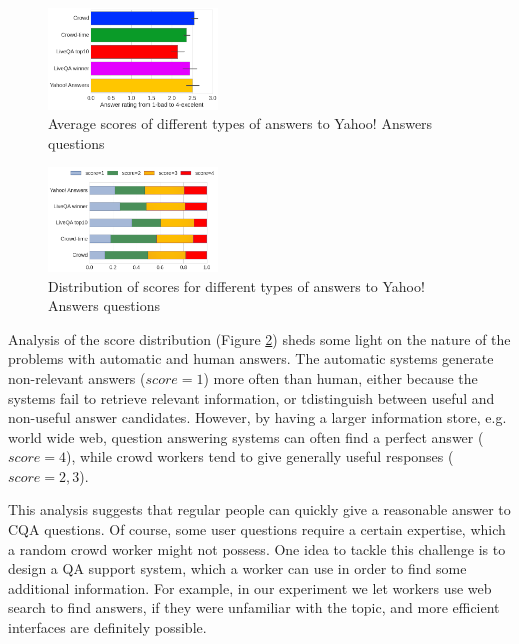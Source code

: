\documentclass[11pt,letterpaper]{article}
\begin{document}
\begin{figure}[h]
	\centering
	\includegraphics[width=0.4\textwidth]{img/average_score}
	\caption{Average scores of different types of answers to Yahoo! Answers questions}
	\label{fig:average_score}
\end{figure}

\begin{figure}[h]
	\centering
	\includegraphics[width=0.4\textwidth]{img/scores_distribution}
	\caption{Distribution of scores for different types of answers to Yahoo! Answers questions}
	\label{fig:scores_distribution}
\end{figure}


Analysis of the score distribution (Figure \ref{fig:scores_distribution}) sheds some light on the nature of the problems with automatic and human answers. The automatic systems generate non-relevant answers ($score=1$) more often than human, either because the systems fail to retrieve relevant information, or tdistinguish between useful and non-useful answer candidates.
However, by having a larger information store, e.g. world wide web, question answering systems can often find a perfect answer ($score=4$), while crowd workers tend to give generally useful responses ($score=2,3$).

This analysis suggests that regular people can quickly give a reasonable answer to CQA questions.
Of course, some user questions require a certain expertise, which a random crowd worker might not possess.
One idea to tackle this challenge is to design a QA support system, which a worker can use in order to find some additional information.
For example, in our experiment we let workers use web search to find answers, if they were unfamiliar with the topic, and more efficient interfaces are definitely possible.
\end{document}
